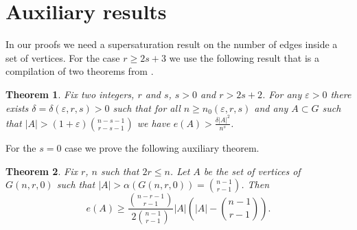 \documentclass[12pt]{article}
\newtheorem{theorem}{Theorem}
\theoremstyle{remark}
\theoremstyle{definition}
\newcommand{\skob}[1]{\left(#1\right)}
\begin{document}







\section{Auxiliary results}

In our proofs we need a supersaturation result on the number of edges inside a set of vertices. For the case $r \geq 2s+3$ we use the following result that is a compilation of two theorems from \cite{ShKup}.

\begin{theorem}\label{SuperSat}
    Fix two integers, $r$ and $s$, $s > 0$ and $r > 2s + 2$. For any $\varepsilon > 0$ there exists $\delta = \delta(\varepsilon, r, s) > 0$ such that for all $n \geq n_0(\varepsilon,r,s)$ and any $A \subset G$ such that $|A| > (1 + \varepsilon)\binom{n-s-1}{r-s-1}$ we have $e(A) > \frac{\delta |A|^2}{n^s}$.
\end{theorem}

For the $s = 0$ case we prove the following auxiliary theorem.

\begin{theorem}
	\label{Spectr}
	Fix $r$, $n$ such that $2r \leq n$. Let $A$ be the set of vertices of $G(n,r,0)$ such that $|A| > \alpha(G(n,r,0)) = \binom{n-1}{r-1}$. Then
	$$
		e(A) \geq \frac{\binom{n-r-1}{r-1}}{2\binom{n-1}{r-1}}|A|\skob{|A| - \binom{n-1}{r-1}}.
	$$
\end{theorem}
\end{document}
